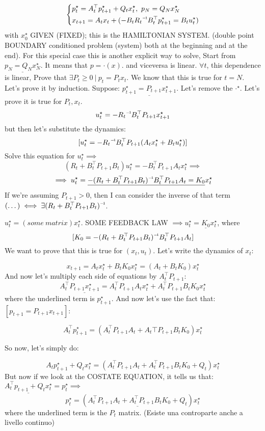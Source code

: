 \[
	\left\{
	\begin{aligned}
	&p_t^\star = A_t^\top p_{t+1}^\star + Q_tx_t^\star,\ p_N = Q_Nx_N^\star\\
	&x_{t+1} = A_tx_t + (-B_t\inv{R_t}B_t^\top p_{t+1}^\star = B_tu_t^\star)
	\end{aligned}
	\right.
\]
with $x_0^\star$ GIVEN (FIXED); this is the HAMILTONIAN SYSTEM.
(double point BOUNDARY conditioned problem (system) both at the beginning and at the end).
For this special case this is another explicit way to solve, Start from $\underline{p_N=Q_Nx_N^\star}$. It means that $p = \mathord{\cdot}(x)$. and viceversa is linear. $\forall t$, this dependence is linear, Prove that $\exists P_t\geq 0\ |\ p_t = P_tx_t$. We know that this is true for $t=N$. Let's prove it by induction. Suppose: $\underline{p_{t+1}^\star = P_{t+1}x_{t+1}^\star}$. Let's remove the $\mathord{\cdot}^\star$. Let's prove it is true for $P_t,x_t$.
\[
	u_t^\star = -\inv{R_t}B_t^\top P_{t+1}x_{t+1}^\star
\]
but then let's substitute the dynamics:
\[
	[u_t^\star = -\inv{R_t}B_t^\top P_{t+1}(A_tx_t^\star + B_tu_t^\star)]
\]
Solve this equation for $u_t^\star \implies$
\[
	(R_t+B_t^\top P_{t+1}B_t)u_t^\star = -B_t^\top P_{t+1}A_tx_t^\star \implies
\]
\[
	\implies u_t^\star = \underline{-\inv{(R_t + B_t^\top P_{t+1}B_t)}B_t^\top P_{t+1}A_t = K_0}x_t^\star
\]
If we're assuming $P_{t+1}>0$, then I can consider the inverse of that term $(\dots) \iff \exists \inv{(R_t + B_t^\top P_{t+1}B_t)}$.

$u_t^\star = (some\ matrix)x_t^\star$. SOME FEEDBACK LAW $\implies u_t^\star = \underline{K_0}x_t^\star$, where
\[
	[K_0 = -\inv{(R_t + B_t^\top P_{t+1}B_t)}B_t^\top P_{t+1}A_t]
\]
We want to prove that this is true for $(x_t,u_t)$. Let's write the dynamics of $x_t$:

\[
	x_{t+1} = A_tx_t^\star + B_tK_0x_t^\star = (A_t+B_tK_0)x_t^\star
\]
And now let's multiply each side of equations by $A_t^\top P_{t+1}$:
\[
	A_t^\top \underline{P_{t+1}x_{t+1}^\star} = A_t^\top P_{t+1}A_tx_t^\star + A_t^\top P_{t+1}B_tK_0x_t^\star
\]
where the underlined term is $p_{t+1}^\star$. And now let's use the fact that: $[p_{t+1}=P_{t+1}x_{t+1}]$:

\[
	A_t^\top p_{t+1}^\star = (A_t^\top P_{t+1}A_t + A_t\top P_{t+1}B_tK_0)x_t^\star
\]

So now, let's simply do:

\[
	A_tp_{t+1}^\star + Q_tx_t^\star = (A_t^\top P_{t+1}A_t + A_t^\top P_{t+1}B_tK_0 + Q_t)x_t^\star
\]
But now if we look at the COSTATE EQUATION, it tells us that: $\underline{A_t^\top p_{t+1} + Q_tx_t^\star} = p_t^\star \implies$
\[
	p_t^\star = (\underline{A_t^\top P_{t+1}A_t + A_t^\top P_{t+1}B_tK_0 + Q_t})x_t^\star
\]
where the underlined term is the $P_t$ matrix. (Esiste una controparte anche a livello continuo)

